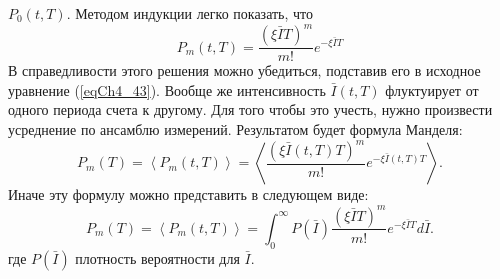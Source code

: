 $P_0\left(t, T\right)$. Методом индукции легко показать, что  
\begin{equation}
P_m\left(t, T\right) = \frac{\left(\xi \bar{I} T\right)^m}{m!} e^{-
  \xi \bar{I} T} 
\label{eqCh4_47}
\end{equation}
В справедливости этого решения можно убедиться, подставив его в
исходное уравнение (\ref{eqCh4_43}). Вообще же интенсивность
$\bar{I}\left(t, T\right)$
флуктуирует от одного периода счета к другому. Для того чтобы
это учесть, нужно произвести усреднение по ансамблю
измерений. Результатом будет формула Манделя: 
\begin{equation}
P_m\left(T\right) = 
\left<P_m\left(t, T\right)\right> = 
\left<
\frac{\left(\xi \bar{I}\left(t, T\right) T\right)^m}{m!} e^{-
  \xi \bar{I}\left(t, T\right) T} 
\right>.
\label{eqCh4_48}
\end{equation}
Иначе эту формулу можно представить в следующем виде:
\begin{equation}
P_m\left(T\right) = 
\left<P_m\left(t, T\right)\right> = 
\int_0^{\infty}
P\left(\bar{I}\right)
\frac{\left(\xi \bar{I}T\right)^m}{m!} e^{-
  \xi \bar{I} T} 
d \bar{I}.
\label{eqCh4_49}
\end{equation}
где $P\left(\bar{I}\right)$ плотность вероятности для $\bar{I}$. 
